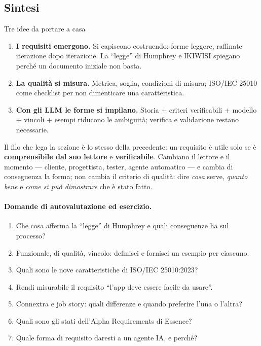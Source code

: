\documentclass[12pt]{extarticle}
\begin{document}
\subsection{Sintesi}

\begin{cbox}{Tre idee da portare a casa}
\begin{enumerate}
    \item \textbf{I requisiti emergono.} Si capiscono costruendo: forme leggere, raffinate iterazione dopo iterazione. La ``legge'' di Humphrey e IKIWISI spiegano perché un documento iniziale non basta.
    \item \textbf{La qualità si misura.} Metrica, soglia, condizioni di misura; ISO/IEC 25010 come checklist per non dimenticare una caratteristica.
    \item \textbf{Con gli LLM le forme si impilano.} Storia + criteri verificabili + modello + vincoli + esempi riducono le ambiguità; verifica e validazione restano necessarie.
\end{enumerate}
\end{cbox}

\noindent Il filo che lega la sezione è lo stesso della precedente: un requisito è utile solo se è \textbf{comprensibile dal suo lettore} e \textbf{verificabile}. Cambiano il lettore e il momento --- cliente, progettista, tester, agente automatico --- e cambia di conseguenza la forma; non cambia il criterio di qualità: dire \textit{cosa} serve, \textit{quanto bene} e \textit{come si può dimostrare} che è stato fatto.

\paragraph{Domande di autovalutazione ed esercizio.}
\begin{enumerate}
    \item Che cosa afferma la ``legge'' di Humphrey e quali conseguenze ha sul processo?
    \item Funzionale, di qualità, vincolo: definisci e fornisci un esempio per ciascuno.
    \item Quali sono le nove caratteristiche di ISO/IEC 25010:2023?
    \item Rendi misurabile il requisito ``l'app deve essere facile da usare''.
    \item Connextra e job story: quali differenze e quando preferire l'una o l'altra?
    \item Quali sono gli stati dell'Alpha Requirements di Essence?
    \item Quale forma di requisito daresti a un agente IA, e perché?
\end{enumerate}
\end{document}
